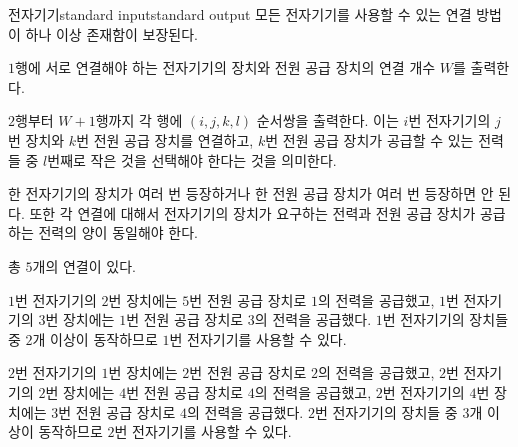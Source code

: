 \begin{problem}{전자기기}{standard input}{standard output}
모든 전자기기를 사용할 수 있는 연결 방법이 하나 이상 존재함이 보장된다.

\OutputFile
$1$행에 서로 연결해야 하는 전자기기의 장치와 전원 공급 장치의 연결 개수 $W$를 출력한다.

$2$행부터 $W+1$행까지 각 행에 $(i, j, k, l)$ 순서쌍을 출력한다. 이는 $i$번 전자기기의 $j$번 장치와 $k$번 전원 공급 장치를 연결하고, $k$번 전원 공급 장치가 공급할 수 있는 전력들 중 $l$번째로 작은 것을 선택해야 한다는 것을 의미한다.

한 전자기기의 장치가 여러 번 등장하거나 한 전원 공급 장치가 여러 번 등장하면 안 된다. 또한 각 연결에 대해서 전자기기의 장치가 요구하는 전력과 전원 공급 장치가 공급하는 전력의 양이 동일해야 한다.

\Example

\begin{example}
%
\end{example}

\Notes

총 $5$개의 연결이 있다.

$1$번 전자기기의 $2$번 장치에는 $5$번 전원 공급 장치로 $1$의 전력을 공급했고, $1$번 전자기기의 $3$번 장치에는 $1$번 전원 공급 장치로 $3$의 전력을 공급했다. $1$번 전자기기의 장치들 중 $2$개 이상이 동작하므로 $1$번 전자기기를 사용할 수 있다.

$2$번 전자기기의 $1$번 장치에는 $2$번 전원 공급 장치로 $2$의 전력을 공급했고, $2$번 전자기기의 $2$번 장치에는 $4$번 전원 공급 장치로 $4$의 전력을 공급했고, $2$번 전자기기의 $4$번 장치에는 $3$번 전원 공급 장치로 $4$의 전력을 공급했다. $2$번 전자기기의 장치들 중 $3$개 이상이 동작하므로 $2$번 전자기기를 사용할 수 있다.

\end{problem}
